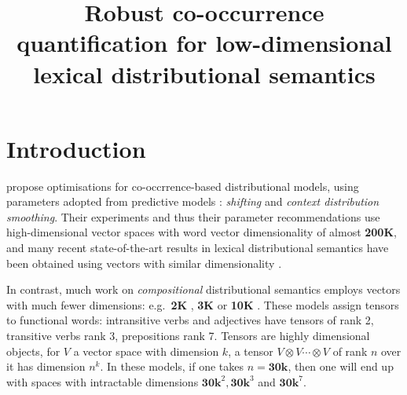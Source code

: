 \documentclass[11pt]{article}
\title{Robust co-occurrence quantification for low-dimensional lexical distributional semantics}
\date{}
\begin{document}
\def\emnlp/{\textit{KS2013}}
\def\PhraseRel/{PhraseRel}

\def\PMI/{$1 \operatorname{PMI}$}
\def\SPMI/{$1 \operatorname{SPMI}$}
\def\CPMI/{$1 \operatorname{CPMI}$}
\def\SCPMI/{$1 \operatorname{SCPMI}$}

\def\NPMI/{$n \operatorname{PMI}$}
\def\NSPMI/{$n \operatorname{SPMI}$}
\def\NCPMI/{$n \operatorname{CPMI}$}
\def\NSCPMI/{$n \operatorname{SCPMI}$}

\def\logNPMI/{$\log n\operatorname{PMI}$}
\def\logNSPMI/{$\log n\operatorname{SPMI}$}
\def\logNCPMI/{$\log n \operatorname{CPMI}$}
\def\logNSCPMI/{$\log n \operatorname{SCPMI}$}

\maketitle
\begin{abstract}

\end{abstract}

\section{Introduction}
\label{sec:introduction}

 propose optimisations for co-occrrence-based distributional models, using parameters adopted from predictive models \cite{mikolov2013efficient}: \emph{shifting} and \emph{context distribution smoothing}. Their experiments and thus their parameter  recommendations use high-dimensional vector spaces with word vector dimensionality of almost \textbf{200K}, and many recent state-of-the-art results in lexical distributional semantics have been obtained using vectors with similar dimensionality  \cite{baroni-dinu-kruszewski:2014:P14-1,kiela-clark:2014:CVSC,lapesa2014large}.

In contrast, much work on \emph{compositional} distributional semantics employs vectors with much fewer dimensions: e.g.~\textbf{2K} \cite{Grefenstette:2011:ESC:2145432.2145580,kartsadrqpl2014,milajevs-EtAl:2014:EMNLP2014}, \textbf{3K} \cite{Dinu:2010:MDS:1870658.1870771,milajevs-purver:2014:CVSC} or \textbf{10K} \cite{polajnar-clark:2014:EACL,Baroni2010nouns}. These models  assign tensors to functional words: intransitive verbs and adjectives have  tensors of rank 2,  transitive verbs  rank 3, prepositions rank 7. Tensors are highly dimensional objects, for $V$ a vector space with dimension $k$,  a tensor $V \otimes V \cdots \otimes V$ of rank $n$ over it has dimension  $n^k$. In these models, if one takes $n= \textbf{30k}$, then one will end up with   spaces with intractable dimensions  $\textbf{30k}^2, \textbf{30k}^3$ and $\textbf{30k}^7$. 
\end{document}
